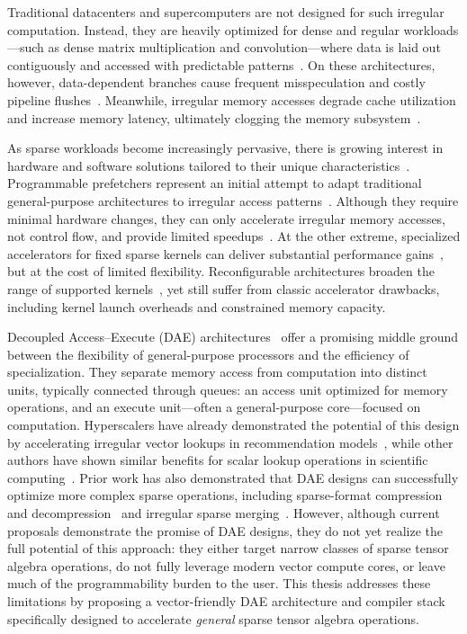 Traditional datacenters and supercomputers are not designed for such irregular computation. Instead, they are heavily optimized for dense and regular workloads---such as dense matrix multiplication and convolution---where data is laid out contiguously and accessed with predictable patterns~\cite{wilkinson2022pmbs,nassif2022isscc,nvidia2022hopper}. On these architectures, however, data-dependent branches cause frequent misspeculation and costly pipeline flushes~\cite{sgherzi2024jpdc}. Meanwhile, irregular memory accesses degrade cache utilization and increase memory latency, ultimately clogging the memory subsystem~\cite{wulf1995hitting,sgherzi2024jpdc}.

As sparse workloads become increasingly pervasive, there is growing interest in hardware and software solutions tailored to their unique characteristics~\cite{gupta2020hpca}. Programmable prefetchers represent an initial attempt to adapt traditional general-purpose architectures to irregular access patterns~\cite{yu2015micro}. Although they require minimal hardware changes, they can only accelerate irregular memory accesses, not control flow, and provide limited speedups~\cite{siracusa2023micro}. At the other extreme, specialized accelerators for fixed sparse kernels can deliver substantial performance gains~\cite{zhang2021asplos}, but at the cost of limited flexibility. Reconfigurable architectures broaden the range of supported kernels~\cite{rucker2021micro,weng2020isca}, yet still suffer from classic accelerator drawbacks, including kernel launch overheads and constrained memory capacity.

Decoupled Access--Execute (DAE) architectures~\cite{smith1982isca} offer a promising middle ground between the flexibility of general-purpose processors and the efficiency of specialization. They separate memory access from computation into distinct units, typically connected through queues: an access unit optimized for memory operations, and an execute unit---often a general-purpose core---focused on computation. Hyperscalers have already demonstrated the potential of this design by accelerating irregular vector lookups in recommendation models~\cite{jouppi2023isca,firoozshahian2023isca}, while other authors have shown similar benefits for scalar lookup operations in scientific computing~\cite{barredo2021sc,orenesvera2022isca}. Prior work has also demonstrated that DAE designs can successfully optimize more complex sparse operations, including sparse-format compression and decompression~\cite{kanellopoulos2019micro,yang2021isca} and irregular sparse merging~\cite{scheffler2021indirection,scheffler2023sparse}. However, although current proposals demonstrate the promise of DAE designs, they do not yet realize the full potential of this approach: they either target narrow classes of sparse tensor algebra operations, do not fully leverage modern vector compute cores, or leave much of the programmability burden to the user. This thesis addresses these limitations by proposing a vector-friendly DAE architecture and compiler stack specifically designed to accelerate \emph{general} sparse tensor algebra operations.


